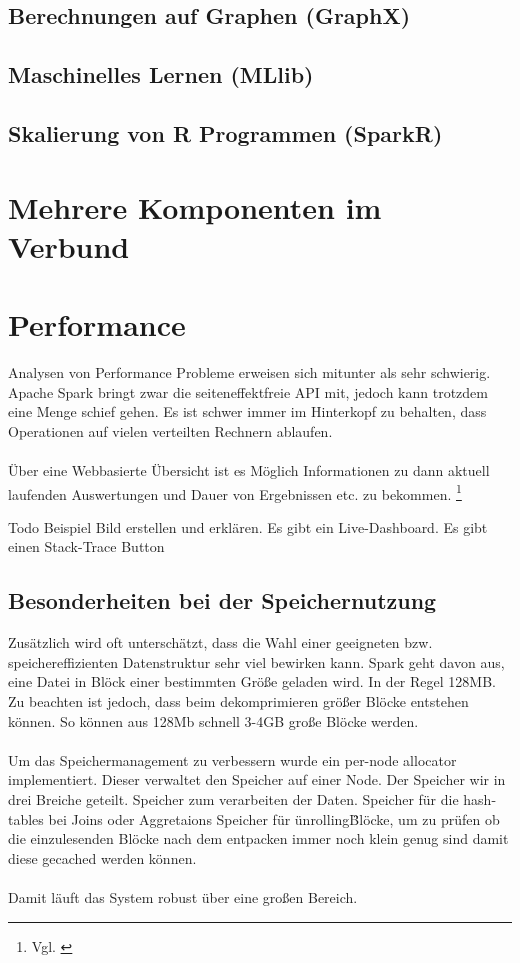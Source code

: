 \newpage
\subsection{Berechnungen auf Graphen (GraphX)}

\newpage
\subsection{Maschinelles Lernen (MLlib)}

\newpage
\subsection{Skalierung von R Programmen (SparkR)}\label{sec_sparkr}

\newpage
\section{Mehrere Komponenten im Verbund}

\newpage
\section{Performance}
Analysen von Performance Probleme erweisen sich mitunter als sehr schwierig. Apache Spark bringt zwar die seiteneffektfreie API mit, jedoch kann trotzdem eine Menge schief gehen. Es ist schwer immer im Hinterkopf zu behalten, dass Operationen auf vielen verteilten Rechnern ablaufen. \\ \\
\"Uber eine Webbasierte Übersicht ist es Möglich Informationen zu dann aktuell laufenden Auswertungen und Dauer von Ergebnissen etc. zu bekommen. \footnote{Vgl. \cite[12]{AAWS15}}

Todo Beispiel Bild erstellen und erklären.
Es gibt ein Live-Dashboard.
Es gibt einen Stack-Trace Button




\subsection{Besonderheiten bei der Speichernutzung}
Zusätzlich wird oft unterschätzt, dass die Wahl einer geeigneten bzw. speichereffizienten Datenstruktur sehr viel bewirken kann.
Spark geht davon aus, eine Datei in Blöck einer bestimmten Größe geladen wird. In der Regel 128MB. Zu beachten ist jedoch, dass beim dekomprimieren größer Blöcke entstehen können. So können aus 128Mb schnell 3-4GB große Blöcke werden. \\ \\
Um das Speichermanagement zu verbessern wurde ein per-node allocator implementiert. Dieser verwaltet den Speicher auf einer Node. 
Der Speicher wir in drei Breiche geteilt. 
Speicher zum verarbeiten der Daten.  
Speicher für die hash-tables bei Joins oder Aggretaions
Speicher für \"unrolling\" Blöcke, um zu prüfen ob die einzulesenden Blöcke nach dem entpacken immer noch klein genug sind damit diese gecached werden können.\\ \\
Damit läuft das System robust über eine großen Bereich. 

